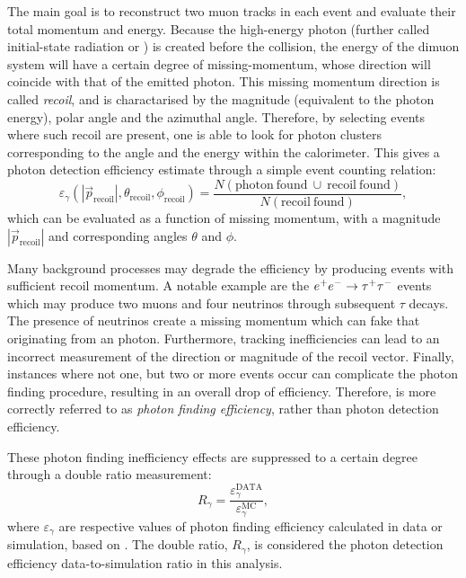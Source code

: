The main goal is to reconstruct two muon tracks in each event and evaluate their total momentum and energy.
Because the high-energy photon (further called initial-state radiation or \ISR) is created before the collision, the energy of the dimuon system will have a certain degree of missing-momentum, whose direction will coincide with that of the emitted photon.
This missing momentum direction is called \textit{recoil}, and is charactarised by the magnitude (equivalent to the photon energy), polar angle and the azimuthal angle.
Therefore, by selecting events where such recoil are present, one is able to look for photon clusters corresponding to the angle and the energy within the calorimeter.
This gives a photon detection efficiency estimate through a simple event counting relation:
\begin{equation}\label{eq:photon_efficiency}
    \varepsilon_{\gamma}(|\vec{p}_{\mathrm{recoil}}|, \theta_{\mathrm{recoil}}, \phi_{\mathrm{recoil}}) = \frac{N(\mathrm{photon~found}~\cup~\mathrm{recoil~found})}{N(\mathrm{recoil~found})},
\end{equation}
which can be evaluated as a function of missing momentum, with a magnitude $|\vec{p}_{\mathrm{recoil}}|$ and corresponding angles $\theta$ and $\phi$.

Many background processes may degrade the efficiency by producing events with sufficient recoil momentum.
A notable example are the $e^+e^-\rightarrow\tau^+\tau^-$ events which may produce two muons and four neutrinos through subsequent $\tau$ decays.
The presence of neutrinos create a missing momentum which can fake that originating from an \ISR photon.
Furthermore, tracking inefficiencies can lead to an incorrect measurement of the direction or magnitude of the recoil vector.
Finally, instances where not one, but two or more \ISR events occur can complicate the photon finding procedure, resulting in an overall drop of efficiency.
Therefore,  is more correctly referred to as \textit{photon finding efficiency}, rather than photon detection efficiency.

These photon finding inefficiency effects are suppressed to a certain degree through a double ratio measurement:
\begin{equation}\label{eq:photon_data_mc}
    R_{\gamma} = \frac{\varepsilon_{\gamma}^{\mathrm{DATA}}}{\varepsilon_{\gamma}^{\mathrm{MC}}},
\end{equation}
where $\varepsilon_{\gamma}$ are respective values of photon finding efficiency calculated in data or simulation, based on .
The double ratio, $R_{\gamma}$, is considered the photon detection efficiency data-to-simulation ratio in this analysis.

